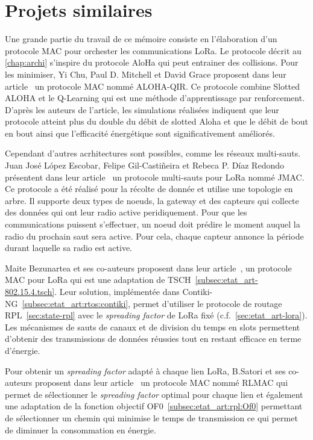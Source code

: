 \section{Projets similaires}\label{sec:etat_art-related-work}
\renewcommand{\rightmark}{Projet similaires}

Une grande partie du travail de ce mémoire consiste en l'élaboration d'un protocole MAC pour
orchester les communications LoRa. Le protocole décrit au \autoref{chap:archi} s'inspire du
protocole AloHa qui peut entrainer des collisions. Pour les minimiser, Yi Chu, Paul D. Mitchell et
David Grace proposent dans leur article~\cite{6328420} un protocole MAC nommé ALOHA-QIR. Ce
protocole combine Slotted ALOHA et le Q-Learning qui est une méthode d'apprentissage par
renforcement. D'après les auteurs de l'article, les simulations réalisées indiquent que leur
protocole atteint plus du double du débit de slotted Aloha et que le débit de bout en bout ainsi
que l'efficacité énergétique sont significativement améliorés.


Cependant d'autres acrhitectures sont possibles, comme les réseaux multi-sauts.
Juan José López Escobar, Felipe Gil-Castiñeira et Rebeca P. Díaz Redondo présentent dans leur article~\cite{s20236893} un protocole multi-sauts pour LoRa nommé JMAC. Ce protocole a été réalisé pour la récolte de donnée et utilise une topologie en arbre. Il supporte deux types de noeuds, la gateway et des capteurs qui collecte des données qui ont leur radio active peridiquement. Pour que les communications puissent s'effectuer, un noeud doit prédire le moment auquel la radio du prochain saut sera active. Pour cela, chaque capteur annonce la période durant laquelle sa radio est active.


Maite Bezunartea et ses co-auteurs proposent dans leur article~\cite{8847137}, un protocole MAC pour LoRa qui est une adaptation de TSCH~\ref{subsec:etat_art-802.15.4.tsch}. Leur solution, implémentée dans Contiki-NG~\ref{subsec:etat_art:rtos:contiki}, permet d'utiliser le protocole de routage RPL~\ref{sec:state-rpl} avec le \textit{spreading factor} de LoRa fixé (c.f.~\ref{sec:etat_art-lora}). Les mécanismes de sauts de canaux et de division du temps en slots permettent d'obtenir des transmissions de données réussies tout en restant efficace en terme d'énergie.

Pour obtenir un \textit{spreading factor} adapté à chaque lien LoRa, B.Satori et ses co-auteurs proposent dans leur article~\cite{8115756} un protocole MAC nommé RLMAC qui permet de sélectionner le \textit{spreading factor} optimal pour chaque lien et également une adaptation de la fonction objectif OF0~\ref{subsec:etat_art:rpl:Of0} permettant de sélectionner un chemin qui minimise le temps de transmission ce qui permet de diminuer la consommation en énergie.


% 
